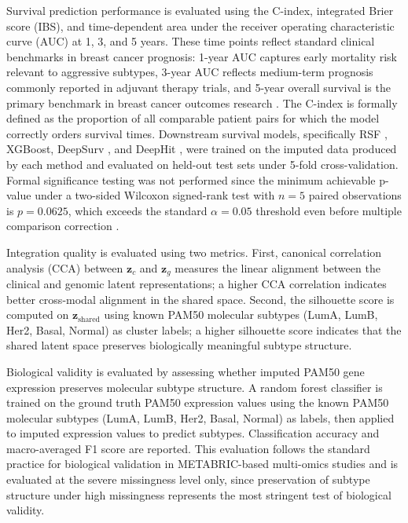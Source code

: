 \documentclass[final,3p,times,authoryear]{elsarticle}
\begin{document}
Survival prediction performance is evaluated using the C-index, integrated Brier score (IBS), and time-dependent area under the receiver operating characteristic curve (AUC) at 1, 3, and 5 years. These time points reflect standard clinical benchmarks in breast cancer prognosis: 1-year AUC captures early mortality risk relevant to aggressive subtypes, 3-year AUC reflects medium-term prognosis commonly reported in adjuvant therapy trials, and 5-year overall survival is the primary benchmark in breast cancer outcomes research \citep{sparano2018adjuvant}. The C-index is formally defined as the proportion of all comparable patient pairs for which the model correctly orders survival times. Downstream survival models, specifically RSF \citep{ishwaran2008random}, XGBoost, DeepSurv \citep{katzman2018deepsurv}, and DeepHit \citep{lee2018deephit}, were trained on the imputed data produced by each method and evaluated on held-out test sets under 5-fold cross-validation. Formal significance testing was not performed since the minimum achievable p-value under a two-sided Wilcoxon signed-rank test with $n=5$ paired observations is $p=0.0625$, which exceeds the standard $\alpha=0.05$ threshold even before multiple comparison correction \citep{conover1999practical}.



Integration quality is evaluated using two metrics. First, canonical correlation analysis (CCA) between $\mathbf{z}_c$ and $\mathbf{z}_g$ measures the linear alignment between the clinical and genomic latent representations; a higher CCA correlation indicates better cross-modal alignment in the shared space. Second, the silhouette score is computed on $\mathbf{z}_{\text{shared}}$ using known PAM50 molecular subtypes (LumA, LumB, Her2, Basal, Normal) as cluster labels; a higher silhouette score indicates that the shared latent space preserves biologically meaningful subtype structure.

Biological validity is evaluated by assessing whether imputed PAM50 gene expression preserves molecular subtype structure. A random forest classifier is trained on the ground truth PAM50 expression values using the known PAM50 molecular subtypes (LumA, LumB, Her2, Basal, Normal) as labels, then applied to imputed expression values to predict subtypes. Classification accuracy and macro-averaged F1 score are reported. This evaluation follows the standard practice for biological validation in METABRIC-based multi-omics studies \citep{curtis2012genomic} and is evaluated at the severe missingness level only, since preservation of subtype structure under high missingness represents the most stringent test of biological validity.
\end{document}
